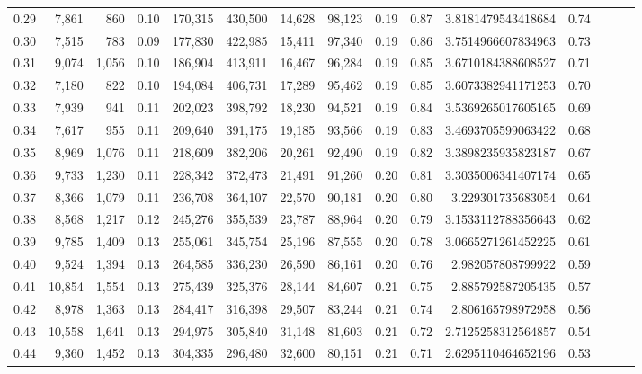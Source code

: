 \begin{tabular}{rrrrrrrrrrrrrrr}
0.29 &   7,861 &    860 &  0.10 &  170,315 &  430,500 &   14,628 &   98,123 &  0.19 &  0.87 &    3.8181479543418684 &      0.74 \\
0.30 &   7,515 &    783 &  0.09 &  177,830 &  422,985 &   15,411 &   97,340 &  0.19 &  0.86 &    3.7514966607834963 &      0.73 \\
0.31 &   9,074 &  1,056 &  0.10 &  186,904 &  413,911 &   16,467 &   96,284 &  0.19 &  0.85 &    3.6710184388608527 &      0.71 \\
0.32 &   7,180 &    822 &  0.10 &  194,084 &  406,731 &   17,289 &   95,462 &  0.19 &  0.85 &    3.6073382941171253 &      0.70 \\
0.33 &   7,939 &    941 &  0.11 &  202,023 &  398,792 &   18,230 &   94,521 &  0.19 &  0.84 &    3.5369265017605165 &      0.69 \\
0.34 &   7,617 &    955 &  0.11 &  209,640 &  391,175 &   19,185 &   93,566 &  0.19 &  0.83 &    3.4693705599063422 &      0.68 \\
0.35 &   8,969 &  1,076 &  0.11 &  218,609 &  382,206 &   20,261 &   92,490 &  0.19 &  0.82 &    3.3898235935823187 &      0.67 \\
0.36 &   9,733 &  1,230 &  0.11 &  228,342 &  372,473 &   21,491 &   91,260 &  0.20 &  0.81 &    3.3035006341407174 &      0.65 \\
0.37 &   8,366 &  1,079 &  0.11 &  236,708 &  364,107 &   22,570 &   90,181 &  0.20 &  0.80 &     3.229301735683054 &      0.64 \\
0.38 &   8,568 &  1,217 &  0.12 &  245,276 &  355,539 &   23,787 &   88,964 &  0.20 &  0.79 &    3.1533112788356643 &      0.62 \\
0.39 &   9,785 &  1,409 &  0.13 &  255,061 &  345,754 &   25,196 &   87,555 &  0.20 &  0.78 &    3.0665271261452225 &      0.61 \\
0.40 &   9,524 &  1,394 &  0.13 &  264,585 &  336,230 &   26,590 &   86,161 &  0.20 &  0.76 &     2.982057808799922 &      0.59 \\
0.41 &  10,854 &  1,554 &  0.13 &  275,439 &  325,376 &   28,144 &   84,607 &  0.21 &  0.75 &     2.885792587205435 &      0.57 \\
0.42 &   8,978 &  1,363 &  0.13 &  284,417 &  316,398 &   29,507 &   83,244 &  0.21 &  0.74 &     2.806165798972958 &      0.56 \\
0.43 &  10,558 &  1,641 &  0.13 &  294,975 &  305,840 &   31,148 &   81,603 &  0.21 &  0.72 &    2.7125258312564857 &      0.54 \\
0.44 &   9,360 &  1,452 &  0.13 &  304,335 &  296,480 &   32,600 &   80,151 &  0.21 &  0.71 &    2.6295110464652196 &      0.53 \\

\end{tabular}
